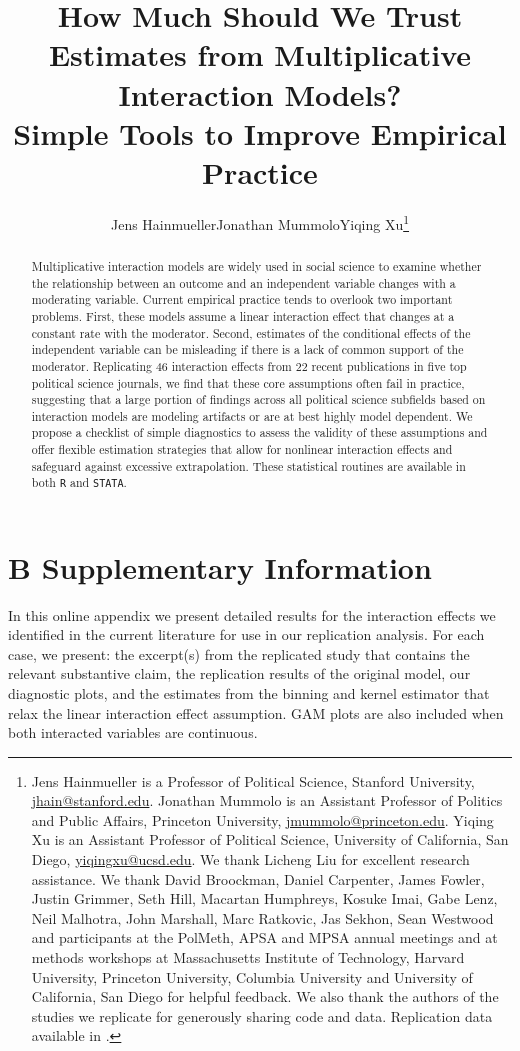 \documentclass[12pt]{article}
\title{How Much Should We Trust Estimates from Multiplicative
  Interaction Models? \\Simple Tools to Improve Empirical Practice}
\author{Jens Hainmueller\hspace{1em}Jonathan Mummolo\hspace{1em}Yiqing Xu\thanks{Jens Hainmueller is a Professor of Political Science, Stanford University, \url{jhain@stanford.edu}. Jonathan Mummolo is an Assistant Professor of Politics and Public Affairs, Princeton University, \url{jmummolo@princeton.edu}. Yiqing Xu is an Assistant Professor of Political Science, University of California, San Diego, \url{yiqingxu@ucsd.edu}. We thank Licheng Liu for excellent research assistance. We thank David Broockman, Daniel Carpenter, James Fowler, Justin Grimmer, Seth Hill, Macartan Humphreys, Kosuke Imai, Gabe Lenz, Neil Malhotra, John Marshall, Marc Ratkovic, Jas Sekhon, Sean Westwood and participants at the PolMeth, APSA and MPSA annual meetings and at methods workshops at Massachusetts Institute of Technology, Harvard University, Princeton University, Columbia University and University of California, San Diego for helpful feedback. We also thank the authors of the studies we replicate for generously sharing code and data. Replication data available in \cite{hmx2018}.}}
\date{}
\begin{document}
\maketitle
\thispagestyle{empty}

\vspace{1em}
\begin{abstract}


  \noindent Multiplicative interaction models are widely used in
  social science to examine whether the relationship between an outcome
  and an independent variable changes with a moderating
  variable. Current empirical practice tends to overlook two important
  problems. First, these models assume a linear interaction effect
  that changes at a constant rate with the moderator. Second, estimates of the conditional effects of the independent variable can be misleading if there is a lack of common support of the moderator. Replicating 46 interaction effects from 22 recent publications in five top political science journals, we find
  that these core assumptions often fail in practice, suggesting
  that a large portion of findings across all political science subfields based on interaction models are modeling artifacts or are at best highly
  model dependent. We propose a checklist of simple diagnostics
  to assess the validity of these assumptions and offer flexible
  estimation strategies that allow for nonlinear interaction effects
  and safeguard against excessive extrapolation. These
    statistical routines are available in both \texttt{R} and
    \texttt{STATA}.
\end{abstract}


\clearpage

\appendix
\section*{B Supplementary Information}
\doublespacing
\setcounter{page}{1}
\setcounter{table}{0}
\setcounter{figure}{0}
\renewcommand\thetable{B\arabic{table}}
\renewcommand\thefigure{B\arabic{figure}}
\renewcommand{\thepage}{B-\arabic{page}}

\label{sec:suppl-append}

In this online appendix we present detailed results for the interaction effects we identified in the current literature for use in our replication analysis. For each case, we present: the excerpt(s) from the replicated study that contains the relevant substantive claim, the replication results of the original model, our diagnostic plots, and the estimates from the binning and kernel estimator that relax the linear interaction effect assumption. GAM plots are also included when both interacted variables are continuous.
\end{document}
